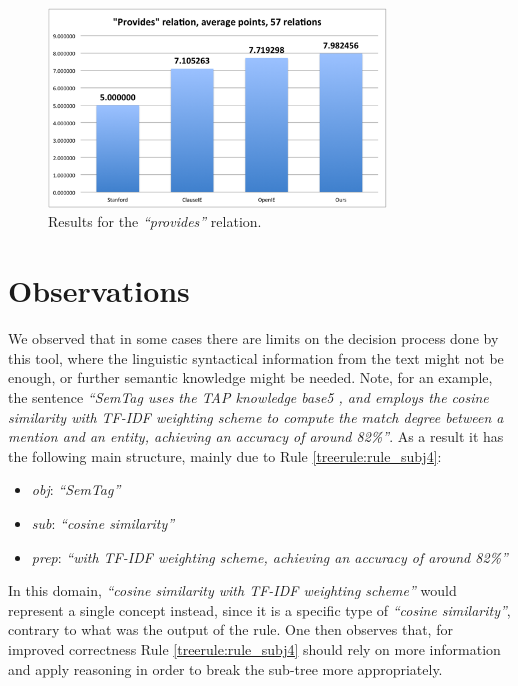 \documentclass[11pt,a4paper,openright]{memoir}
\begin{document}
\begin{figure}[!htbp]
  \centering
    \includegraphics[width=0.8\textwidth]{./images/image002}
  \caption[Results for the \emph{\enquote{provides}} relation.]{Results for the \emph{\enquote{provides}} relation.}
  \label{fig:result_provides}
\end{figure}



\section{Observations}
\label{section:observations}

We observed that in some cases there are limits on the decision process done by this tool, where the linguistic syntactical information from the text might not be enough, or further semantic knowledge might be needed. Note, for an example, the sentence \emph{\enquote{SemTag uses the TAP knowledge base5 , and employs the cosine similarity with TF-IDF weighting scheme to compute the match degree between a mention and an entity, achieving an accuracy of around 82\%}}. As a result it has the following main structure, mainly due to Rule \ref{treerule:rule_subj4}:
	\begin{itemize}
	  \item \emph{obj}: \emph{\enquote{SemTag}}
	  \item \emph{sub}: \emph{\enquote{cosine similarity}}
	  \item \emph{prep}: \emph{\enquote{with TF-IDF weighting scheme, achieving an accuracy of around 82\%}}
	\end{itemize}

In this domain, \emph{\enquote{cosine similarity with TF-IDF weighting scheme}} would represent a single concept instead, since it is a specific type of \emph{\enquote{cosine similarity}}, contrary to what was the output of the rule. One then observes that, for improved correctness Rule \ref{treerule:rule_subj4} should rely on more information and apply reasoning in order to break the sub-tree more appropriately.
\end{document}
